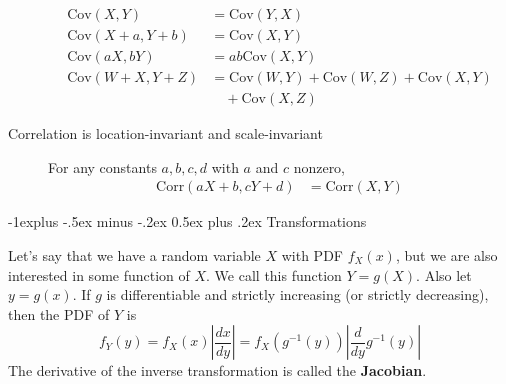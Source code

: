 \documentclass[6pt, landscape]{article}
\makeatletter
\renewcommand{\subsection}{\@startsection{subsection}{2}{0mm}%
                                {-1explus -.5ex minus -.2ex}%
                                {0.5ex plus .2ex}%
                                {\small\bfseries}}
\newcommand{\cov}{\textrm{Cov}}
\newcommand{\corr}{\textrm{Corr}}
\makeatother
\begin{document}
\begin{multicols}{3}
\begin{description}
                      \begin{align*}
                              \cov(X, Y)         & = \cov(Y, X)                           \\
                              \cov(X + a, Y + b) & = \cov(X, Y)                           \\
                              \cov(aX, bY)       & = ab\cov(X, Y)                         \\
                              \cov(W + X, Y + Z) & = \cov(W, Y) + \cov(W, Z) + \cov(X, Y) \\
                                                 & \quad + \cov(X, Z)
                      \end{align*}
                \item [Correlation is location-invariant and scale-invariant] For any constants $a,b,c,d$ with $a$ and $c$ nonzero,
                      \begin{align*}
                              \corr(aX + b, cY + d) & = \corr(X, Y)
                      \end{align*}
        \end{description}

        \subsection{Transformations}
        \begin{description}
                \label{one variable transformations}
                \item[One Variable Transformations] Let's say that we have a random variable $X$ with PDF $f_X(x)$, but we are also interested in some function of $X$. We call this function $Y = g(X)$. Also let $y=g(x)$. If $g$ is differentiable and strictly increasing (or strictly decreasing), then the PDF of $Y$ is
                      \[f_Y(y) = f_X(x)\left|\frac{dx}{dy}\right| =  f_X(g^{-1}(y))\left|\frac{d}{dy}g^{-1}(y)\right|\]
                      The derivative of the inverse transformation is called the \textbf{Jacobian}.



\end{description}
\end{multicols}
\end{document}
